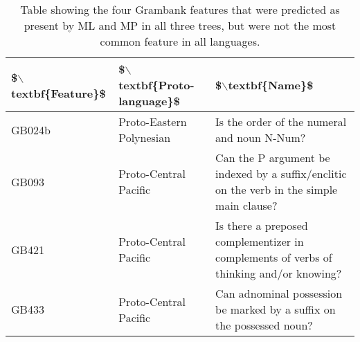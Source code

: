 \begin{table}[ht]
\centering
\begin{tabular}{p{2cm}p{4cm}p{8cm}}
  \hline
\$$\backslash$textbf\{Feature\}\$ & \$$\backslash$textbf\{Proto-language\}\$ & \$$\backslash$textbf\{Name\}\$ \\ 
  \hline
GB024b & Proto-Eastern Polynesian & Is the order of the numeral and noun N-Num? \\ 
  GB093 & Proto-Central Pacific & Can the P argument be indexed by a suffix/enclitic on the verb in the simple main clause? \\ 
  GB421 & Proto-Central Pacific & Is there a preposed complementizer in complements of verbs of thinking and/or knowing? \\ 
  GB433 & Proto-Central Pacific & Can adnominal possession be marked by a suffix on the possessed noun? \\ 
   \hline
\end{tabular}
\caption{Table showing the four Grambank features that were predicted as present by ML and MP in all three trees, but were not the most common feature in all languages.} 
\label{table_extra_predictions_four}
\end{table}
